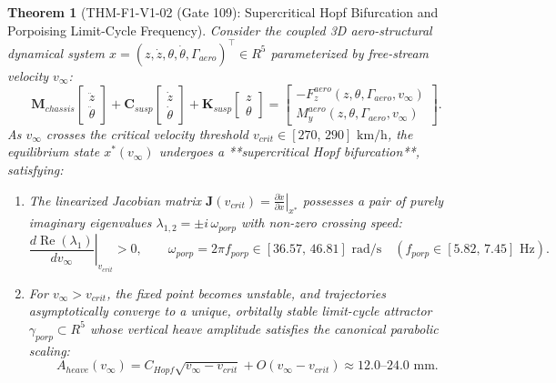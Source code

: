 \documentclass[11pt,a4paper,reqno]{article}
\def\bm#1{#1}%
\def\texttt#1{#1}%
\def\mathrm#1{#1}%
\def\mathcal#1{#1}%
\def\mathbb#1{#1}%
\theoremstyle{plain}
\newtheorem{theorem}{Theorem}[section]
\theoremstyle{definition}
\theoremstyle{remark}
\numberwithin{equation}{section}
\begin{document}
\begin{theorem}[{\texttt{THM-F1-V1-02} (Gate 109): Supercritical Hopf Bifurcation and Porpoising Limit-Cycle Frequency}]
\label{thm:porpoising_hopf}
Consider the coupled 3D aero-structural dynamical system $\bm{x} = (z, \dot{z}, \theta, \dot{\theta}, \Gamma_{\mathrm{aero}})^\top \in \mathbb{R}^5$ parameterized by free-stream velocity $v_\infty$:
\begin{equation}
  \mathbf{M}_{\mathrm{chassis}}
  \begin{bmatrix}
    \ddot{z} \\
    \ddot{\theta}
  \end{bmatrix}
  + \mathbf{C}_{\mathrm{susp}}
  \begin{bmatrix}
    \dot{z} \\
    \dot{\theta}
  \end{bmatrix}
  + \mathbf{K}_{\mathrm{susp}}
  \begin{bmatrix}
    z \\
    \theta
  \end{bmatrix}
  =
  \begin{bmatrix}
    -F_z^{\mathrm{aero}}(z, \theta, \Gamma_{\mathrm{aero}}, v_\infty) \\
    M_y^{\mathrm{aero}}(z, \theta, \Gamma_{\mathrm{aero}}, v_\infty)
  \end{bmatrix}.
  \label{eq:coupled_aeroelastic_system}
\end{equation}
As $v_\infty$ crosses the critical velocity threshold $v_{\mathrm{crit}} \in [270,\, 290]\text{ km/h}$, the equilibrium state $\bm{x}^*(v_\infty)$ undergoes a **supercritical Hopf bifurcation**, satisfying:
\begin{enumerate}[label=(\roman*),leftmargin=2.2em,itemsep=2pt]
  \item The linearized Jacobian matrix $\mathbf{J}(v_{\mathrm{crit}}) = \left.\frac{\partial \dot{\bm{x}}}{\partial \bm{x}}\right|_{\bm{x}^*}$ possesses a pair of purely imaginary eigenvalues $\lambda_{1,2} = \pm i\,\omega_{\mathrm{porp}}$ with non-zero crossing speed:
  \begin{equation}
    \left.\frac{d\operatorname{Re}(\lambda_1)}{dv_\infty}\right|_{v_{\mathrm{crit}}} > 0, \qquad \omega_{\mathrm{porp}} = 2\pi f_{\mathrm{porp}} \in [36.57,\, 46.81]\text{ rad/s} \quad (f_{\mathrm{porp}} \in [5.82,\, 7.45]\text{ Hz}).
    \label{eq:hopf_frequency}
  \end{equation}
  \item For $v_\infty > v_{\mathrm{crit}}$, the fixed point becomes unstable, and trajectories asymptotically converge to a unique, orbitally stable limit-cycle attractor $\gamma_{\mathrm{porp}} \subset \mathbb{R}^5$ whose vertical heave amplitude satisfies the canonical parabolic scaling:
  \begin{equation}
    A_{\mathrm{heave}}(v_\infty) = \mathcal{C}_{\mathrm{Hopf}}\sqrt{v_\infty - v_{\mathrm{crit}}} + \mathcal{O}\!\left(v_\infty - v_{\mathrm{crit}}\right) \approx 12.0\text{--}24.0\text{ mm}.
    \label{eq:limit_cycle_amplitude}
  \end{equation}
\end{enumerate}
\end{theorem}
\end{document}
